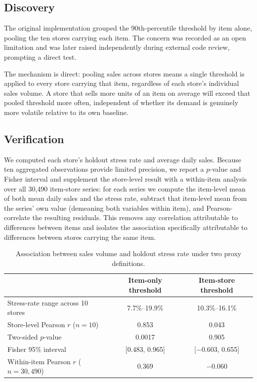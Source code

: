 \documentclass[11pt]{article}
\begin{document}
\subsection{Discovery}

The original implementation grouped the 90th-percentile threshold by item alone, pooling the ten stores carrying each item. The concern was recorded as an open limitation and was later raised independently during external code review, prompting a direct test.

The mechanism is direct: pooling sales across stores means a single threshold is applied to every store carrying that item, regardless of each store's individual sales volume. A store that sells more units of an item on average will exceed that pooled threshold more often, independent of whether its demand is genuinely more volatile relative to its own baseline.

\subsection{Verification}

We computed each store's holdout stress rate and average daily sales. Because ten aggregated observations provide limited precision, we report a $p$-value and Fisher interval and supplement the store-level result with a within-item analysis over all 30{,}490 item-store series: for each series we compute the item-level mean of both mean daily sales and the stress rate, subtract that item-level mean from the series' own value (demeaning both variables within item), and Pearson-correlate the resulting residuals. This removes any correlation attributable to differences between items and isolates the association specifically attributable to differences between stores carrying the same item.

\begin{table}[h]
\centering
\caption{Association between sales volume and holdout stress rate under two proxy definitions.}
\label{tab:confound}
\begin{tabular}{lcc}
\toprule
& Item-only threshold & Item-store threshold \\
\midrule
Stress-rate range across 10 stores & 7.7\%--19.9\% & 10.3\%--16.1\% \\
Store-level Pearson $r$ ($n=10$) & 0.853 & 0.043 \\
Two-sided $p$-value & 0.0017 & 0.905 \\
Fisher 95\% interval & [0.483, 0.965] & [$-$0.603, 0.655] \\
Within-item Pearson $r$ ($n=30{,}490$) & 0.369 & $-$0.060 \\
\bottomrule
\end{tabular}
\end{table}
\end{document}

